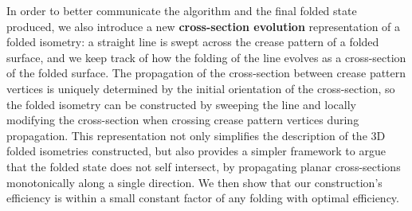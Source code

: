 \documentclass[a4paper,11pt]{article}
\begin{document}
In order to better communicate the algorithm and the final folded state
produced, we also introduce a new {\bf cross-section evolution} representation
of a folded isometry: a straight line is swept across the crease pattern of a
folded surface, and we keep track of how the folding of the line evolves as a
cross-section of the folded surface. The propagation of the cross-section
between crease pattern vertices is uniquely determined by the initial
orientation of the cross-section, so the folded isometry can be constructed by
sweeping the line and locally modifying the cross-section when crossing crease
pattern vertices during propagation. This representation not only simplifies the
description of the 3D folded isometries constructed, but also provides a simpler
framework to argue that the folded state does not self intersect, by propagating
planar cross-sections monotonically along a single direction. We then
show that our construction's efficiency is within a small constant factor of
any folding with optimal efficiency.

\let\realbibitem=\bibitem
\def\smallbibitem{\par \vspace{-1.2ex}\realbibitem}
\def\bibitem{\let\bibitem=\smallbibitem \realbibitem}

{
\small


}
\end{document}
